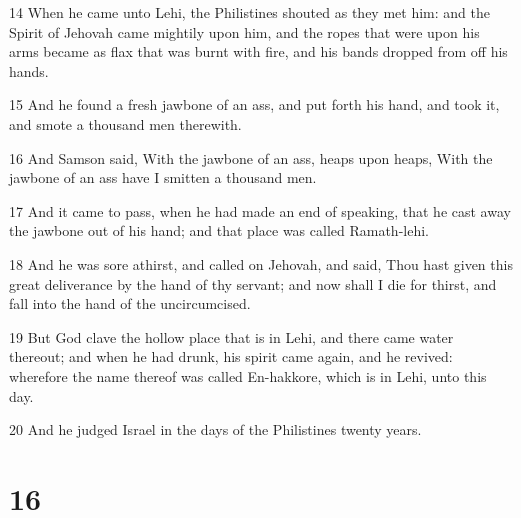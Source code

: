 \par 14 When he came unto Lehi, the Philistines shouted as they met him: and the Spirit of Jehovah came mightily upon him, and the ropes that were upon his arms became as flax that was burnt with fire, and his bands dropped from off his hands.
\par 15 And he found a fresh jawbone of an ass, and put forth his hand, and took it, and smote a thousand men therewith.
\par 16 And Samson said, With the jawbone of an ass, heaps upon heaps, With the jawbone of an ass have I smitten a thousand men.
\par 17 And it came to pass, when he had made an end of speaking, that he cast away the jawbone out of his hand; and that place was called Ramath-lehi.
\par 18 And he was sore athirst, and called on Jehovah, and said, Thou hast given this great deliverance by the hand of thy servant; and now shall I die for thirst, and fall into the hand of the uncircumcised.
\par 19 But God clave the hollow place that is in Lehi, and there came water thereout; and when he had drunk, his spirit came again, and he revived: wherefore the name thereof was called En-hakkore, which is in Lehi, unto this day.
\par 20 And he judged Israel in the days of the Philistines twenty years.

\chapter{16}

